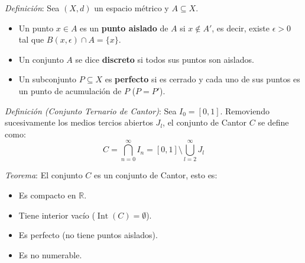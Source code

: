 \documentclass{beamer}
\begin{document}
  \begin{frame}
    \textit{Definición}: Sea $(X, d)$ un espacio métrico y $A \subseteq X$.
    \newline

    \begin{itemize}[<+->]
      \item Un punto $x \in A$ es un \textbf{punto aislado} de $A$ si $x \notin A'$, es decir, existe $\epsilon > 0$ tal que $B(x, \epsilon) \cap A = \{x\}$.
      \item Un conjunto $A$ se dice \textbf{discreto} si todos sus puntos son aislados.
      \item Un subconjunto $P \subseteq X$ es \textbf{perfecto} si es cerrado y cada uno de sus puntos es un punto de acumulación de $P$ ($P = P'$).
    \end{itemize}
  \end{frame}

  \begin{frame}
    \textit{Definición (Conjunto Ternario de Cantor)}:
    \newline
    Sea $I_0 = [0, 1]$. Removiendo sucesivamente los medios tercios abiertos $J_l$, el conjunto de Cantor $C$ se define como:
    \[ C = \bigcap_{n=0}^\infty I_n = [0, 1] \setminus \bigcup_{l=2}^\infty J_l \]

    \pause
    \vspace{0.5em}
    \textit{Teorema}: El conjunto $C$ es un conjunto de Cantor, esto es:
    \newline
    \begin{itemize}[<+->]
      \item Es compacto en $\mathbb{R}$.
      \item Tiene interior vacío ($\operatorname{Int}(C) = \emptyset$).
      \item Es perfecto (no tiene puntos aislados).
      \item Es no numerable.
    \end{itemize}
  \end{frame}
\end{document}
